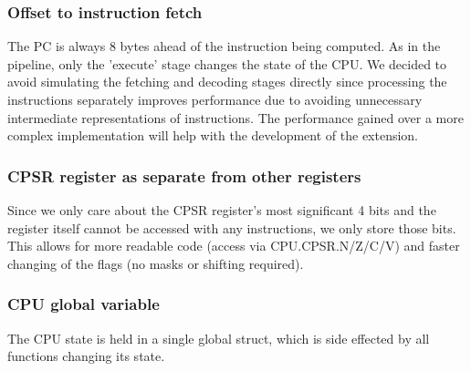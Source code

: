 \documentclass[11pt]{article}
\begin{document}
        \subsubsection*{Offset to instruction fetch}
           The PC is always 8 bytes ahead of the instruction being computed. As in the pipeline, only the 'execute' stage changes the state of the CPU. We decided to avoid simulating the fetching and decoding stages directly since processing the instructions separately improves performance due to avoiding unnecessary intermediate representations of instructions. The performance gained over a more complex implementation will help with the development of the extension.
        \subsubsection*{CPSR register as separate from other registers}
            Since we only care about the CPSR register's most significant 4 bits and the register itself cannot be accessed with any instructions, we only store those bits. This allows for more readable code (access via CPU.CPSR.N/Z/C/V) and faster changing of the flags (no masks or shifting required).
        \subsubsection*{CPU global variable}
            The CPU state is held in a single global struct, which is side effected by all functions changing its state.
\end{document}
